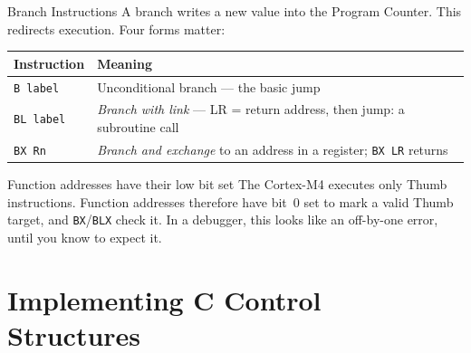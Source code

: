 \documentclass[9pt,aspectratio=169,xcolor=table]{beamer}
\begin{document}
\begin{frame}{Branch Instructions}
    A branch writes a new value into the Program Counter. This redirects execution. Four forms matter:

    \vspace{2mm}
    \begin{center}
    {\normalsize
    \striped
    \begin{tabular}{@{}l l@{}}
        \toprule
        \textbf{Instruction} & \textbf{Meaning} \\
        \midrule
        \texttt{B label}   & Unconditional branch --- the basic jump \\
        \texttt{BL label}  & \emph{Branch with link} --- LR = return address, then jump: a subroutine call \\
        \texttt{BX Rn}     & \emph{Branch and exchange} to an address in a register; \texttt{BX LR} returns \\
        \bottomrule
    \end{tabular}}
    \end{center}

    \vspace{3mm}
    \begin{block}{Function addresses have their low bit set}
        The Cortex-M4 executes only Thumb instructions. \alert{Function
        addresses therefore have bit~0 set} to mark a valid Thumb
        target, and \texttt{BX}/\texttt{BLX} check it. In a debugger,
        this looks like an off-by-one error, until you know to expect
        it.
    \end{block}
\end{frame}


\section{Implementing C Control Structures}
\end{document}
